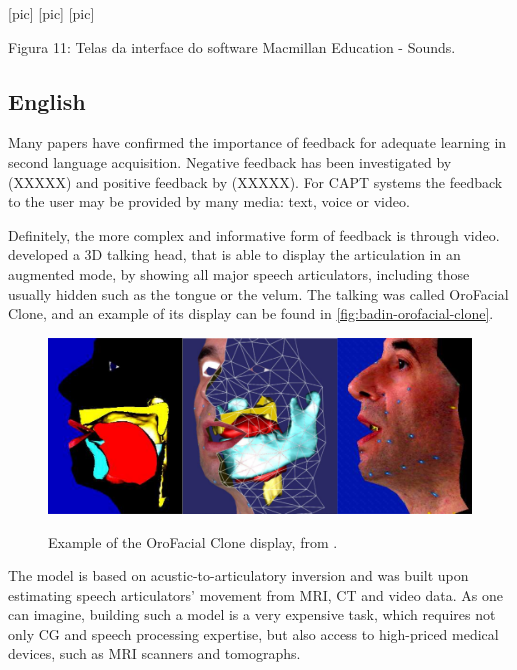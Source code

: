                          [pic]  [pic]  [pic]

Figura 11: Telas da interface do software Macmillan Education - Sounds.

\subsection{English}

Many papers have confirmed the importance of feedback for adequate learning in second language
acquisition. Negative feedback has been investigated by (XXXXX) and positive feedback by (XXXXX).
For \ac{CAPT} systems the feedback to the user may be provided by many media: text, voice or video.

Definitely, the more complex and informative form of feedback is through video. \citeauthor{Badin2010} \citep{Badin2010}
developed a 3D talking head, that is able to display the articulation in an augmented mode,
by showing all major speech articulators, including those usually hidden such as the tongue or the velum. The talking
was called OroFacial Clone, and an example of its display can be found in \autoref{fig:badin-orofacial-clone}.

\begin{figure}[!htb]
        \myfloatalign
        {\includegraphics[width=.66\linewidth]{gfx/badin-orofacial-clone.png}}
        \caption{Example of the OroFacial Clone display, from \citeauthor{Badin2010} \citep{Badin2010}.}
        \label{fig:badin-orofacial-clone}
\end{figure}

The model is based on acustic-to-articulatory inversion and was built upon estimating speech articulators' 
movement from \ac{MRI}, \ac{CT} and video data. As one can imagine, building such a model is a very expensive task, which 
requires not only \ac{CG} and speech processing expertise, but also access to high-priced medical devices, such as 
\ac{MRI} scanners and tomographs. 

